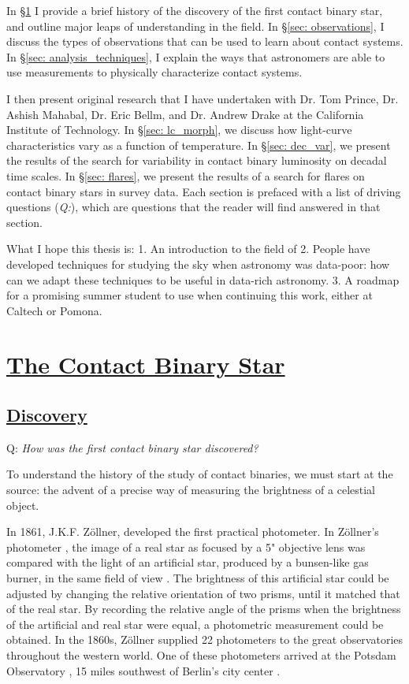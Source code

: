 \documentclass[12pt]{article} %
\numberwithin{equation}{section} %
\begin{document}
In \S \ref{sec: background} I provide a brief history of the discovery of the first contact binary star, and outline major leaps of understanding in the field. In \S \ref{sec: observations}, I discuss the types of observations that can be used to learn about contact systems. In \S \ref{sec: analysis_techniques}, I explain the ways that astronomers are able to use measurements to physically characterize contact systems.

I then present original research that I have undertaken with Dr. Tom Prince, Dr. Ashish Mahabal, Dr. Eric Bellm, and Dr. Andrew Drake at the California Institute of Technology. In \S \ref{sec: lc_morph}, we discuss how light-curve characteristics vary as a function of temperature. In \S \ref{sec: dec_var}, we present the results of the search for variability in contact binary luminosity on decadal time scales. In \S \ref{sec: flares}, we present the results of a search for flares on contact binary stars in survey data. Each section is prefaced with a list of driving questions (\emph{Q:}), which are questions that the reader will find answered in that section.

What I hope this thesis is:
1. An introduction to the field of 
2. People have developed techniques for studying the sky when astronomy was data-poor: how can we adapt these techniques to be useful in data-rich astronomy.
3. A roadmap for a promising summer student to use when continuing this work, either at Caltech or Pomona.

\section[The Contact Binary Star]{\hyperlink{toc}{The Contact Binary Star}} \label{sec: background}

\subsection[\emph{Discovery}]{\hyperlink{toc}{Discovery}}

Q: \emph{How was the first contact binary star discovered?}

To understand the history of the study of contact binaries, we must start at the source: the advent of a precise way of measuring the brightness of a celestial object.  

In 1861, J.K.F. Z\"ollner, developed the first practical photometer. In Z\"ollner's photometer , the image of a real star as focused by a 5" objective lens was compared with the light of an artificial star, produced by a bunsen-like gas burner, in the same field of view \citep{staubermann2000trouble}. The brightness of this artificial star could be adjusted by changing the relative orientation of two prisms, until it matched that of the real star. By recording the relative angle of the prisms when the brightness of the artificial and real star were equal, a photometric measurement could be obtained. In the 1860s, Z\"ollner supplied 22 photometers to the great observatories throughout the western world. One of these photometers arrived at the Potsdam Observatory , 15 miles southwest of Berlin's city center \citep{krisciunas2001brief}.
\end{document}
